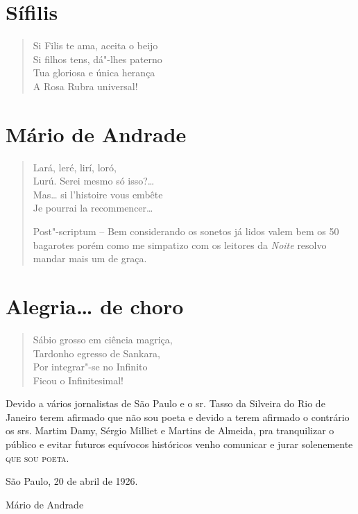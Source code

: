 \medskip
\section*{Sífilis}

\begin{verse}
Si Filis te ama, aceita o beijo\\
Si filhos tens, dá"-lhes paterno\\
Tua gloriosa e única herança\\
A Rosa Rubra universal!
\end{verse}

\medskip
\section*{Mário de Andrade}

\begin{verse}
Lará, leré, lirí, loró,\\
Lurú. Serei mesmo só isso?\ldots{}\\
Mas\ldots{} si l'histoire vous embête\\
Je pourrai la recommencer\ldots{}

Post"-scriptum -- Bem considerando os sonetos já lidos valem bem os 50
bagarotes porém como me simpatizo com os leitores da \emph{Noite}
resolvo mandar mais um de graça.
\end{verse}

\medskip
\section*{Alegria\ldots{} de choro}

\begin{verse}
Sábio grosso em ciência magriça,\\
Tardonho egresso de Sankara,\\
Por integrar"-se no Infinito\\
Ficou o Infinitesimal!
\end{verse}


\begingroup\centering\parbox{165pt}{
Devido a vários jornalistas de São Paulo e o sr. Tasso da Silveira do
Rio de Janeiro terem afirmado que não sou poeta e devido a terem
afirmado o contrário os srs. Martim Damy, Sérgio Milliet e Martins de
Almeida, pra tranquilizar o público e evitar futuros equívocos
históricos venho comunicar e jurar solenemente \textsc{que sou poeta.}

\hfill{}São Paulo, 20 de abril de 1926.

\hfill{}Mário de Andrade}\endgroup

